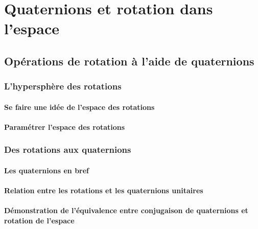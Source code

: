
\chapter{Quaternions et rotation dans l'espace}


\section{Opérations de rotation à l'aide de quaternions}
	
	\subsection{L'hypersphère des rotations}
		\subsubsection{Se faire une idée de l'espace des rotations}
			
		\subsubsection{Paramétrer l'espace des rotations}
			
	\subsection{Des rotations aux quaternions}
		\subsubsection{Les quaternions en bref}
			
		\subsubsection{Relation entre les rotations et les quaternions unitaires}
			
		\subsubsection{Démonstration de l'équivalence entre conjugaison de quaternions et rotation de l'espace}
			
